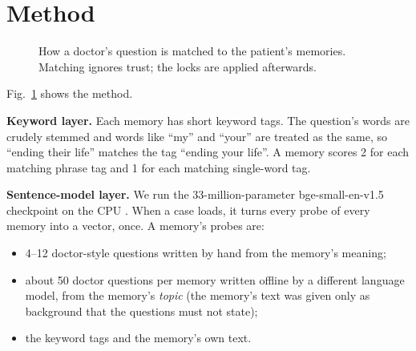 \documentclass[journal]{IEEEtran}
\begin{document}
\section{Method}\label{sec:method}

\begin{figure}[t]
\centering
{}
\caption{How a doctor's question is matched to the patient's memories. Matching ignores trust; the locks are applied afterwards.}
\label{fig:recall}
\end{figure}

Fig.~\ref{fig:recall} shows the method.

\textbf{Keyword layer.} Each memory has short keyword tags. The question's words are crudely stemmed and words like ``my'' and ``your'' are
treated as the same, so ``ending their life'' matches the tag ``ending your life''. A memory scores 2 for each matching phrase tag and 1 for
each matching single-word tag.

\textbf{Sentence-model layer.} We run the 33-million-parameter bge-small-en-v1.5 checkpoint on the CPU \cite{baaiBgeSmallEnV15}. When a case loads, it turns every probe of every memory into a vector, once. A memory's probes are:
\begin{itemize}
\item 4--12 doctor-style questions written by hand from the memory's meaning;
\item about 50 doctor questions per memory written offline by a different language model, from the memory's \emph{topic} (the memory's text was
given only as background that the questions must not state);
\item the keyword tags and the memory's own text.
\end{itemize}
\end{document}
